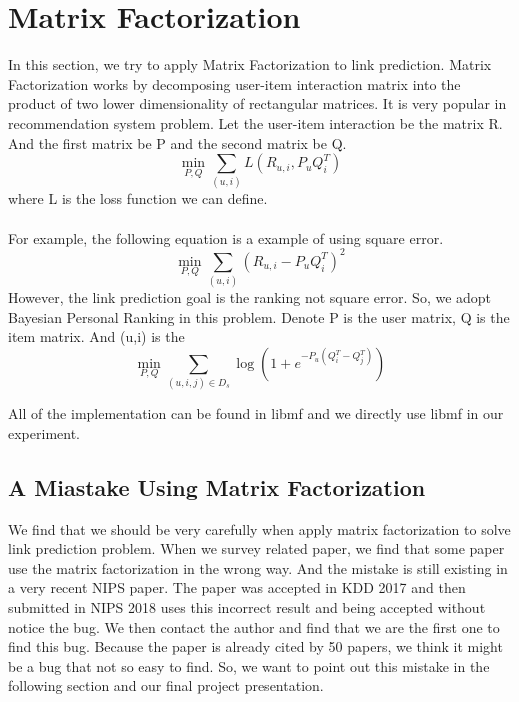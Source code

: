 \documentclass[12pt]{article}
\begin{document}
\section{Matrix Factorization}

In this section, we try to apply Matrix Factorization to link prediction. Matrix Factorization works by decomposing user-item interaction matrix into the product of two lower dimensionality of rectangular matrices. It is very popular in recommendation system problem. Let the user-item interaction be the matrix R. And the first matrix be P and the second matrix be Q.  
\\
\begin{equation}
\min_{P,Q}{\sum_{(u,i)}{L(R_{u,i}, P_uQ_i^T)}}
\end{equation}
where L is the loss function we can define. \\
\\
For example, the following equation is a example of using square error. \\
\begin{equation}
\min_{P,Q}{\sum_{(u,i)}{(R_{u,i}-P_uQ_i^T)^2}}
\end{equation}
However, the link prediction goal is the ranking not square error. So, we adopt Bayesian Personal Ranking\cite{bpr} in this problem. Denote P is the user matrix, Q is the item matrix. And (u,i) is the 
\begin{equation}
\min_{P,Q} \sum_{(u,i,j)\in D_s}\log(1+e^{-P_u(Q_i^T - Q_j^T)})
\end{equation}

All of the implementation can be found in libmf\cite{libmf} and we directly use libmf in our experiment.

\subsection{A Miastake Using Matrix Factorization}
We find that we should be very carefully when apply matrix factorization to solve link prediction problem.
When we survey related paper, we find that some paper use the matrix factorization in the wrong way. And the mistake is still existing in a very recent NIPS paper. The paper was accepted in KDD 2017 and then submitted in NIPS 2018 uses this incorrect result and being accepted without notice the bug. We then contact the author and  find that we are the first one to find this bug. Because the paper is already cited by 50 papers, we think it might be a bug that not so easy to find. So, we want to point out this mistake in the following section and our final project presentation.   
\end{document}
